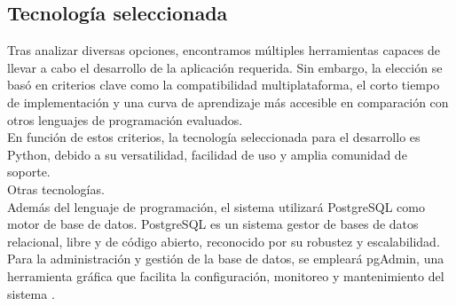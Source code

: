 \subsection{Tecnología seleccionada}
Tras analizar diversas opciones, encontramos múltiples herramientas capaces de llevar a cabo el desarrollo de la aplicación requerida. Sin embargo, la elección se basó en criterios clave como la compatibilidad multiplataforma, el corto tiempo de implementación y una curva de aprendizaje más accesible en comparación con otros lenguajes de programación evaluados. \\
En función de estos criterios, la tecnología seleccionada para el desarrollo es Python, debido a su versatilidad, facilidad de uso y amplia comunidad de soporte. \\
Otras tecnologías. \\
Además del lenguaje de programación, el sistema utilizará PostgreSQL como motor de base de datos. PostgreSQL es un sistema gestor de bases de datos relacional, libre y de código abierto, reconocido por su robustez y escalabilidad. Para la administración y gestión de la base de datos, se empleará pgAdmin, una herramienta gráfica que facilita la configuración, monitoreo y mantenimiento del sistema \cite{doc}. \\
